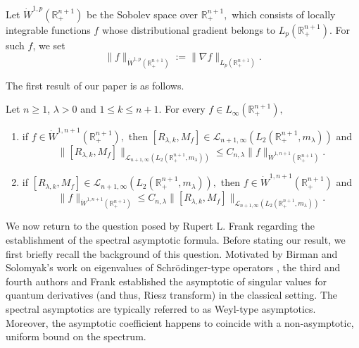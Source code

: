 \documentclass[12pt]{amsart}
\begin{document}




\begin{definition}
Let $\dot{W}^{1,p}(\mathbb{R}_+^{n+1})$ be the Sobolev space over $\mathbb{R}_+^{n+1},$ which consists of locally integrable functions $f$ whose distributional gradient belongs to $L_p(\mathbb{R}_+^{n+1})$. For such $f$, we set
$$\|f\|_{\dot{W}^{1,p}(\mathbb{R}_+^{n+1})}:=\|\nabla f\|_{L_p(\mathbb{R}_+^{n+1})}.$$
\end{definition}

The first result of our paper is as follows.

\begin{theorem}\label{main theorem} Let $n\geq1$, $\lambda>0$ and $1\leq k\leq n+1.$ For every $f\in L_{\infty}(\mathbb{R}^{n+1}_+),$
\begin{enumerate}[{\rm (i)}]
\item\label{mta} if $f\in\dot{W}^{1,n+1}(\mathbb{R}^{n+1}_+),$ then $[R_{\lambda,k},M_f]\in \mathcal{L}_{n+1,\infty}(L_2(\mathbb{R}^{n+1}_+,m_{\lambda}))$ and
$$\|[R_{\lambda,k},M_f]\|_{\mathcal{L}_{n+1,\infty}(L_2(\mathbb{R}^{n+1}_+,m_{\lambda}))}\leq C_{n,\lambda}\|f\|_{\dot{W}^{1,n+1}(\mathbb{R}^{n+1}_+)}.$$
\item\label{mtb} if $[R_{\lambda,k},M_f]\in \mathcal{L}_{n+1,\infty}(L_2(\mathbb{R}^{n+1}_+,m_{\lambda})),$ then $f\in\dot{W}^{1,n+1}(\mathbb{R}^{n+1}_+)$ and
$$\|f\|_{\dot{W}^{1,n+1}(\mathbb{R}^{n+1}_+)}\leq C_{n,\lambda}\|[R_{\lambda,k},M_f]\|_{\mathcal{L}_{n+1,\infty}(L_2(\mathbb{R}^{n+1}_+,m_{\lambda}))}.$$
\end{enumerate}
\end{theorem}

We now return to the question posed by Rupert L. Frank regarding the establishment of the spectral asymptotic formula. Before stating our result, we first briefly recall the background of this question. Motivated by Birman and Solomyak's work on eigenvalues of Schr\"{o}dinger-type operators \cite{MR1192782,MR279638}, the third and fourth authors and Frank \cite{FSZ} established the asymptotic of singular values for quantum derivatives (and thus, Riesz transform) in the classical setting. The spectral asymptotics are typically referred to as Weyl-type asymptotics. Moreover, the asymptotic coefficient happens to coincide with a non-asymptotic, uniform bound on the spectrum.
\end{document}

